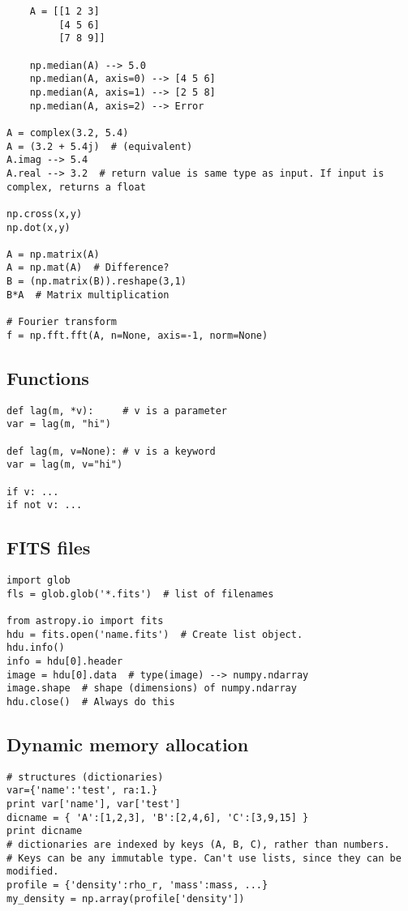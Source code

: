 \documentclass{article}
\begin{document}
\begin{multicols}{2}
\begin{lstlisting}
    A = [[1 2 3]
         [4 5 6]
         [7 8 9]]

    np.median(A) --> 5.0
    np.median(A, axis=0) --> [4 5 6]
    np.median(A, axis=1) --> [2 5 8]
    np.median(A, axis=2) --> Error

A = complex(3.2, 5.4)
A = (3.2 + 5.4j)  # (equivalent)
A.imag --> 5.4
A.real --> 3.2  # return value is same type as input. If input is complex, returns a float

np.cross(x,y)
np.dot(x,y)

A = np.matrix(A)
A = np.mat(A)  # Difference?
B = (np.matrix(B)).reshape(3,1)
B*A  # Matrix multiplication

# Fourier transform
f = np.fft.fft(A, n=None, axis=-1, norm=None)
\end{lstlisting}

\newpage
\subsection{Functions}
\begin{lstlisting}
def lag(m, *v):     # v is a parameter
var = lag(m, "hi")

def lag(m, v=None): # v is a keyword
var = lag(m, v="hi")

if v: ...
if not v: ...
\end{lstlisting}
\columnbreak


\subsection{FITS files}
\begin{lstlisting}
import glob
fls = glob.glob('*.fits')  # list of filenames

from astropy.io import fits
hdu = fits.open('name.fits')  # Create list object.
hdu.info()
info = hdu[0].header
image = hdu[0].data  # type(image) --> numpy.ndarray
image.shape  # shape (dimensions) of numpy.ndarray
hdu.close()  # Always do this
\end{lstlisting}

\subsection{Dynamic memory allocation}
\begin{lstlisting}
# structures (dictionaries)
var={'name':'test', ra:1.}
print var['name'], var['test']
dicname = { 'A':[1,2,3], 'B':[2,4,6], 'C':[3,9,15] }
print dicname
# dictionaries are indexed by keys (A, B, C), rather than numbers.
# Keys can be any immutable type. Can't use lists, since they can be modified.
profile = {'density':rho_r, 'mass':mass, ...}
my_density = np.array(profile['density'])


\end{lstlisting}
\end{multicols}
\end{document}
